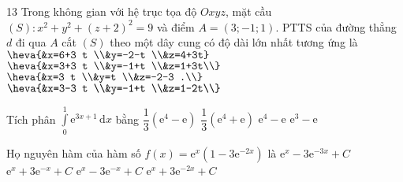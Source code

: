 \begin{ex}13%
Trong không gian với hệ trục tọa độ $Oxyz$, mặt cầu $(S)\colon x^{2}+y^{2}+(z+2)^{2}=9$ và điểm $A=(3 ;-1 ; 1)$. PTTS của đường thẳng $d$ đi qua $A$ cắt $(S)$ theo một dây cung có độ dài lớn nhất tương ứng là
\choice
{\True $\heva{&x=6+3 t \\&y=-2-t \\&z=4+3t}$}
{$\heva{&x=3+3 t \\&y=-1+t \\&z=1+3t\\}$}
{$\heva{&x=3 t \\&y=t \\&z=-2-3 .\\}$}
{$\heva{&x=3-3 t \\&y=-1+t \\&z=1-2t\\}$}

\end{ex}

\begin{ex}%
Tích phân $ \displaystyle\int\limits_{0}^{1}\mathrm{e}^{3x+1}\mathrm{\,d}x $ bằng
\choice
{\True $ \dfrac{1}{3}\left(\mathrm{e}^4-\mathrm{e}\right) $}
{$ \dfrac{1}{3}\left(\mathrm{e}^4+\mathrm{e}\right) $}
{$ \mathrm{e}^4-\mathrm{e} $}
{$ \mathrm{e}^3-\mathrm{e} $}
\end{ex}

\begin{ex}%
Họ nguyên hàm của hàm số $f(x)=\mathrm{e}^x(1-3 \mathrm{e}^{-2x})$ là
\choice
{$\mathrm{e}^x-3 \mathrm{e}^{-3x}+C$}
{\True $\mathrm{e}^x+3 \mathrm{e}^{-x}+C$}
{$\mathrm{e}^x-3 \mathrm{e}^{-x}+C$}
{$\mathrm{e}^x+3 \mathrm{e}^{-2x}+C$}
\end{ex}

